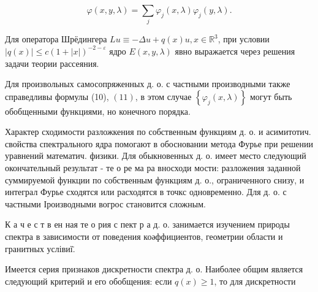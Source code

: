 \documentclass[10pt]{article}
\begin{document}
\[

\varphi(x, y, \lambda)=\sum_{j} \varphi_{j}(x, \lambda) \varphi_{j}(y, \lambda) .

\]



Для оператора Шрёдингера $L u \equiv-\Delta u+q(x) u, x \in \mathbb{R}^{3}$, при условии $|q(x)| \leqslant c(1+|x|)^{-2-\varepsilon}$ ядро $E(x, y, \lambda)$ явно выражается через решения задачи теории рассеяния.



Для произвольных самосопряженных д. о. с частными производными также справедливы формулы (10), $(11)$, в этом случае $\left\{\varphi_{j}(x, \lambda)\right\}$ могут быть обобщенными функциями, но конечного порядка.



Характер сходимости разложкения по собственным функциям д. о. и асимитотич. свойства спектрального ядра помогают в обосновании метода Фурье при решении уравнений математич. физики. Для обыкновенных д. о. имеет место следующий окончательный результат - те о ре ма ра вносходи мости: разложения заданной суммируемой функции по собственным функциям д. о., ограниченного снизу, и интеграл Фурье сходятся или расходятся в точкс одновременно. Для д. о. с частными Іроизводными вогрос становится сложным.



К а ч е с т в ен ная те о рия с пект р а д. о. занимается изучением природы спектра в зависимости от поведения коәффициентов, геометрии области и гранитных услівиї̈.



Имеется серия признаков дискретности спектра д. о. Наиболее общим является следующий критерий и его обобщения: если $q(x) \geqslant 1$, то для дискретности
\end{document}
